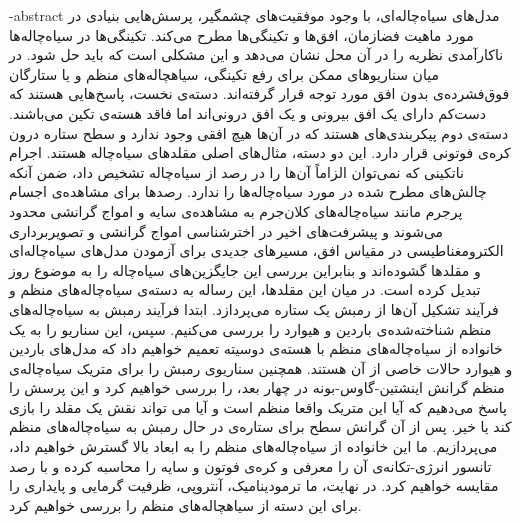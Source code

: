 \fa-abstract{
مدل‌های سیاه‌چاله‌ای، با وجود موفقیت‌های چشمگیر، پرسش‌هایی بنیادی در مورد ماهیت فضازمان، افق‌ها و تکینگی‌ها مطرح می‌کند. تکینگی‌ها در سیاه‌چاله‌ها ناکارآمدی نظریه را در آن محل نشان می‌دهد و این مشکلی است که باید حل شود. در میان سناریوهای ممکن برای رفع تکینگی، سیاهچاله‌های منظم و یا ستارگان فوق‌فشرده‌ی بدون افق مورد توجه قرار گرفته‌اند. دسته‌ی نخست، پاسخ‌هایی هستند که دست‌کم دارای یک افق بیرونی و یک افق درونی‌اند اما فاقد هسته‌ی تکین می‌باشند. دسته‌ی دوم پیکربندی‌های هستند که در آن‌ها هیچ افقی وجود ندارد و سطح ستاره درون کره‌ی فوتونی قرار دارد.
این دو دسته، مثال‌های اصلی مقلدهای سیاه‌چاله هستند. اجرام ناتکینی که نمی‌توان الزاماً آن‌ها را در رصد از سیاه‌چاله تشخیص داد، ضمن آنکه چالش‌های مطرح شده در مورد سیاه‌چاله‌ها را ندارد.
 رصد‌ها برای مشاهده‌ی اجسام پرجرم مانند سیاه‌چاله‌های کلان‌جرم به مشاهده‌ی سایه و امواج گرانشی محدود می‌شوند و  پیشرفت‌های اخیر در اخترشناسی امواج گرانشی و تصویربرداری الکترومغناطیسی در مقیاس افق، مسیرهای جدیدی برای آزمودن مدل‌های سیاه‌چاله‌ای و مقلدها گشوده‌اند و بنابراین  بررسی این جایگزین‌های سیاه‌چاله را به موضوع روز تبدیل کرده است. در میان این مقلدها، این رساله به دسته‌ی سیاه‌چاله‌های منظم و فرآیند تشکیل آن‌ها از رمبش یک ستاره می‌پردازد. ابتدا فرآیند رمبش به سیاه‌چاله‌های منظم شناخته‌شده‌ی باردین و هیوارد را بررسی می‌کنیم. سپس، این سناریو را به یک خانواده از سیاه‌چاله‌های منظم با هسته‌ی دوسیته تعمیم خواهیم داد که مدل‌های باردین و هیوارد حالات خاصی از آن هستند. همچنین سناریوی رمبش را برای متریک سیاه‌چاله‌ی منظم گرانش اینشتین-گاوس-بونه در چهار بعد، را بررسی خواهیم کرد و این پرسش را پاسخ می‌دهیم که آیا این متریک واقعا منظم است و آیا می تواند نقش یک مقلد را بازی کند یا خیر. پس از آن گرانش سطح برای ستاره‌ی در حال رمبش به سیاه‌چاله‌‌های منظم می‌پردازیم. ما این خانواده از سیاه‌چاله‌های منظم را به ابعاد بالا گسترش خواهیم داد، تانسور انرژی-تکانه‌ی آن را معرفی و کره‌ی فوتون و سایه را محاسبه کرده و با رصد مقایسه خواهیم کرد. در نهایت،  ما ترمودینامیک، آنتروپی، ظرفیت گرمایی و پایداری را برای این دسته از سیاهچاله‌های منظم را بررسی خواهیم کرد.
}

\abstractPage




\newpage\clearpage